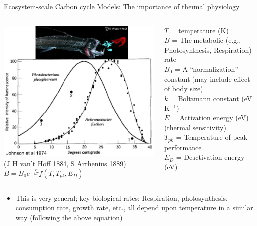 \documentclass[xcolor={usenames,x11names},compress]{beamer}
\renewcommand{\(}{\begin{columns}}
\renewcommand{\)}{\end{columns}}
\newcommand{\<}[1]{\begin{column}{#1}}
\renewcommand{\>}{\end{column}}
\begin{document}
\begin{frame}{Ecosystem-scale Carbon cycle Models: The importance of thermal physiology}
      
  \begin{columns}[c]
    \column{2.1in}
    \pause
    \includegraphics[width=\textwidth]{graphics/Photobacterium.pdf}\\
    {\scriptsize (J H van't Hoff 1884, S Arrhenius 1889)}
    \pause
    \column{2.7in}
    $B = B_0 \boxed {e^{-\frac{E}{kT}}}f(T,T_{pk},E_D)$\\
    \vspace{6pt}
    \raggedright{\footnotesize $T$ = temperature (K)\\
    $B$ = The metabolic (e.g., Photosynthesis, Respiration) rate \\   
    $B_0$ = A ``normalization'' constant (may include effect of body size) \\   
    $k$ = Boltzmann constant (eV K$^{-1}$)\\
    $E$ = Activation energy (eV) (thermal sensitivity)\\
    $T_{pk}$ = Temperature of peak performance\\
    $E_D$ = Deactivation energy (eV)}
  \end{columns}

  \pause

  \begin{itemize}\setlength{\itemindent}{0em}

    \item This is very general; key biological rates: Respiration, photosynthesis, consumption rate, growth rate, etc., all depend upon temperature in a similar way (following the above equation)

  \end{itemize} 

\end{frame}
\end{document}
